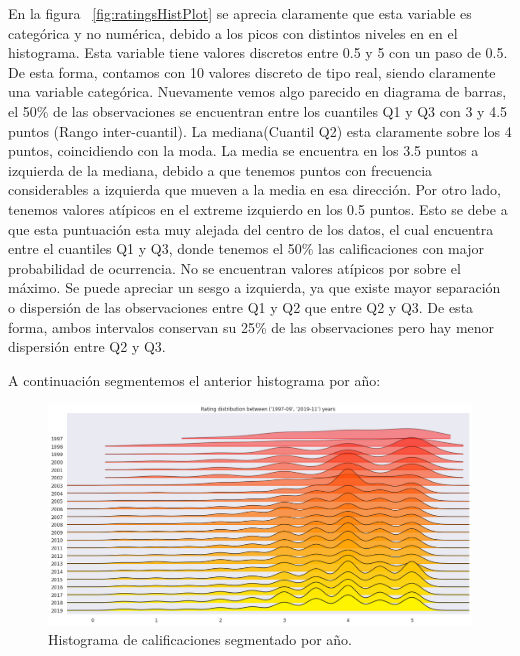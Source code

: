 \documentclass[11pt,a4paper,twoside]{thesis}
\begin{document}
En la figura ~\ref{fig:ratingsHistPlot} se aprecia claramente que esta variable es categórica y no numérica, debido a los picos con distintos niveles en en el histograma. Esta variable tiene valores discretos entre 0.5 y 5 con un paso de 0.5. De esta forma, contamos con 10 valores discreto de tipo real, siendo claramente una variable categórica. Nuevamente vemos algo parecido en diagrama de barras, el 50\% de las observaciones se encuentran entre los cuantiles Q1 y Q3 con 3 y 4.5 puntos (Rango inter-cuantil). La mediana(Cuantil Q2) esta claramente sobre los 4 puntos, coincidiendo con la moda. La media se encuentra en los 3.5 puntos a izquierda de la mediana, debido a que tenemos puntos con frecuencia considerables a izquierda que mueven a la media en esa dirección.
Por otro lado, tenemos valores atípicos en el extreme izquierdo en los 0.5 puntos. Esto se debe a que esta puntuación esta muy alejada del centro de los datos, el cual encuentra entre el cuantiles Q1 y Q3, donde tenemos el 50\% las calificaciones con major probabilidad de ocurrencia. No se encuentran valores atípicos por sobre el máximo.
Se puede apreciar un sesgo a izquierda, ya que existe mayor separación o dispersión de las observaciones entre Q1 y Q2 que entre Q2 y Q3. De esta forma, ambos intervalos conservan su 25\% de las observaciones pero hay menor dispersión entre Q2 y Q3.


\clearpage
A continuación segmentemos el anterior histograma por año:

\begin{figure}[h!]
	\centering
	\includegraphics[width=15cm]{./images/rating-by-year.png}
	\caption{Histograma de calificaciones segmentado por año.}
	\label{fig:ratingsYearHistPlot}
\end{figure}
\end{document}

